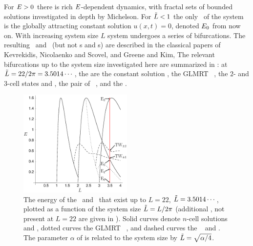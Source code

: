 For $E>0$ there is rich
$E$-dependent dynamics, with
fractal sets of bounded solutions investigated in
depth by Michelson.
%
%
For $\tilde{L}<1$ the only \eqv\ of the system is the
globally attracting constant
solution $u(x,t)=0$, denoted $E_{0}$ from now on. With increasing system size $L$ system
undergoes a series of bifurcations.
The resulting \eqva\ and
\reqva\ (but not \po s and \rpo s)
are described in the classical papers of
Kevrekidis, Nicolaenko and Scovel,
and Greene and Kim,
The relevant bifurcations
up to the system size
investigated here are summarized
in :
at $\tilde{L}=22/2\pi =
3.5014\cdots$, the {\eqva} are the constant solution
, the GLMRT \eqv\ , the $2$-
and $3$-cell states  and , the pair of \reqva\
, and the   \reqva.

\begin{figure}[t]       \label{fig:ksBifDiag}
\begin{center}
\includegraphics[width=0.5\textwidth]{figs/ksBifDiag_pst.eps}
\end{center}
\caption{
The energy  of the \eqva\ and \reqva\ that
exist up to $L=22$, $\tilde{L} = 3.5014\cdots$, plotted as a function
of the system size $\tilde{L} = L/2\pi$ (additional \eqva, not present
at $L = 22$ are given in \refref{ksgreene88}). Solid curves denote
$n$-cell solutions \EQV{2} and \EQV{3}, dotted curves the GLMRT
\eqv\ ,
and dashed curves the \reqva\ \REQV{\pm}{1} and \REQV{\pm}{2}.
The parameter $\alpha$ of  is
related to the system size by $\tilde{L}=\sqrt{\alpha/4}$.
        }
\end{figure}


